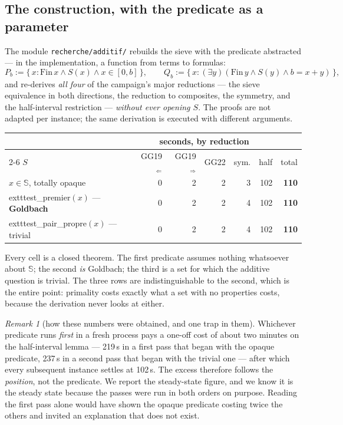 \documentclass[11pt]{article}
\theoremstyle{remark}\newtheorem{remark}{Remark}
\begin{document}
\subsection{The construction, with the predicate as a parameter}

The module \texttt{recherche/additif/} rebuilds the sieve with the predicate abstracted
--- in the implementation, a function from terms to formulas:
\[
P_b := \{\, x : \mathrm{Fin}\,x \wedge S(x) \wedge x \in [0,b] \,\},
\qquad
Q_b := \{\, x : (\exists y)(\mathrm{Fin}\,y \wedge S(y) \wedge b = x + y) \,\},
\]
and re-derives \emph{all four} of the campaign's major reductions --- the sieve
equivalence in both directions, the reduction to composites, the symmetry, and the
half-interval restriction --- \emph{without ever opening $S$}. The proofs are not
adapted per instance; the same derivation is executed with different arguments.

\begin{center}
\begin{tabular}{@{}lrrrrrr@{}}
\toprule
& \multicolumn{5}{c}{seconds, by reduction} & \\
\cmidrule(lr){2-6}
$S$ & GG19$_\Leftarrow$ & GG19$_\Rightarrow$ & GG22 & sym. & half & total \\
\midrule
$x \in \mathbb{S}$, totally opaque & 0 & 2 & 2 & 3 & 102 & \textbf{110} \\
	exttt{est\_premier}$(x)$ --- \textbf{Goldbach} & 0 & 2 & 2 & 4 & 102 & \textbf{110} \\
	exttt{est\_pair\_propre}$(x)$ --- trivial & 0 & 2 & 2 & 4 & 102 & \textbf{110} \\
\bottomrule
\end{tabular}
\end{center}

Every cell is a closed theorem. The first predicate assumes nothing whatsoever about
$\mathbb{S}$; the second \emph{is} Goldbach; the third is a set for which the additive
question is trivial. The three rows are indistinguishable to the second, which is the
entire point: primality costs exactly what a set with no properties costs, because the
derivation never looks at either.

\begin{remark}[how these numbers were obtained, and one trap in them]
Whichever predicate runs \emph{first} in a fresh process pays a one-off cost of about
two minutes on the half-interval lemma --- 219\,s in a first pass that began with the
opaque predicate, 237\,s in a second pass that began with the trivial one --- after which
every subsequent instance settles at 102\,s. The excess therefore follows the
\emph{position}, not the predicate. We report the steady-state figure, and we know it is
the steady state because the passes were run in both orders on purpose. Reading the
first pass alone would have shown the opaque predicate costing twice the others and
invited an explanation that does not exist.
\end{remark}
\end{document}
